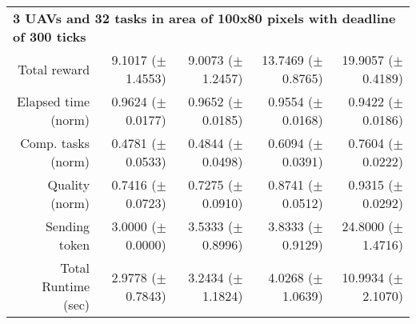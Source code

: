 \begin{table}
\begin{tabular}{rrrrr}
		\multicolumn{5}{l}{\textbf{3 UAVs and 32 tasks in area of 100x80 pixels with deadline of 300 ticks}} \\
		Total reward           &   9.1017  ($\pm$1.4553)   &  9.0073  ($\pm$1.2457)    &  13.7469 ($\pm$0.8765) &   19.9057  ($\pm$0.4189) \\
		Elapsed time (norm)    &   0.9624  ($\pm$0.0177)   &  0.9652  ($\pm$0.0185)    &  0.9554  ($\pm$0.0168) &   0.9422   ($\pm$0.0186) \\ 
		Comp. tasks (norm)     &   0.4781  ($\pm$0.0533)   &  0.4844  ($\pm$0.0498)    &  0.6094  ($\pm$0.0391) &   0.7604   ($\pm$0.0222) \\ 
		Quality (norm)         &   0.7416  ($\pm$0.0723)   &  0.7275  ($\pm$0.0910)    &  0.8741  ($\pm$0.0512) &   0.9315   ($\pm$0.0292) \\ 
		Sending token          &   3.0000  ($\pm$0.0000)   &  3.5333  ($\pm$0.8996)    &  3.8333  ($\pm$0.9129) &   24.8000  ($\pm$1.4716) \\ 
		Total Runtime (sec)    &   2.9778  ($\pm$0.7843)   &  3.2434  ($\pm$1.1824)    &  4.0268  ($\pm$1.0639) &   10.9934  ($\pm$2.1070) \\ [1ex]
                     
		\hline
	\end{tabular}
\end{table} 

